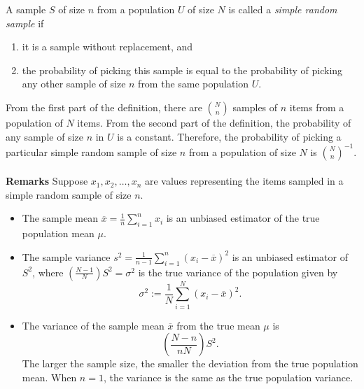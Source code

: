 \documentclass[12pt]{article}
\begin{document}
A sample $S$ of size $n$ from a population $U$ of size $N$ is called
a \emph{simple random sample} if
\begin{enumerate}
\item it is a sample without replacement, and
\item the probability of picking this sample is equal to the
probability of picking any other sample of size $n$ from the same
population $U$.
\end{enumerate}
From the first part of the definition, there are $\binom{N}{n}$
samples of $n$ items from a population of $N$ items.  From the
second part of the definition, the probability of any sample of size
$n$ in $U$ is a constant.  Therefore, the probability of picking a
particular simple random sample of size $n$ from a population of
size $N$ is $\binom{N}{n}^{-1}$.
\\\\
\textbf{Remarks}  Suppose $x_1,x_2,\ldots,x_n$ are values
representing the items sampled in a simple random sample of size
$n$.
\begin{itemize}
\item The sample mean $\overline{x}=\frac{1}{n}\sum_{i=1}^{n}x_i$ is an
unbiased estimator of the true population mean $\mu$.
\item The sample variance $s^2=\frac{1}{n-1}
\sum_{i=1}^{n}(x_i-\overline{x})^2$ is an unbiased estimator of
$S^2$, where $(\frac{N-1}{N})S^2=\sigma^2$ is the true variance of
the population given by
$$\sigma^2:=\frac{1}{N}\sum_{i=1}^{N}(x_i-\overline{x})^2.$$
\item The variance of the sample mean $\overline{x}$ from the true
mean $\mu$ is $$\left(\frac{N-n}{nN}\right) S^2.$$  The larger the sample size,
the smaller the deviation from the true population mean.  When
$n=1$, the variance is the same as the true population variance.
\end{itemize}
\end{document}
